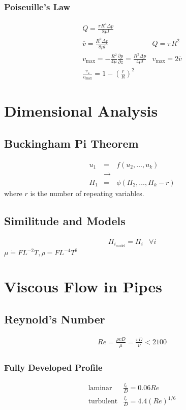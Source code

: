 \documentclass[a4paper]{amsart}
\begin{document}
\subsubsection{Poiseuille's Law}
\begin{eqnarray*}
	Q=\frac{\pi R^4\Delta p}{8\mu l}\\
	\overline v = \frac{R^2\Delta p}{8\mu l}&Q=\pi R^2\\
	v_{\text{max}}=-\frac{R^2}{4\mu}\frac{\partial p}{\partial z}=\frac{R^2\Delta p}{4\mu l}
	& v_{\text{max}}=2\overline v\\
	\frac{v_z}{v_{\text{max}}}=1-\left(\frac{r}{R}\right)^2
\end{eqnarray*}


\section{Dimensional Analysis}
\subsection{Buckingham Pi Theorem}
\begin{eqnarray*}
	u_1&=&f(u_2,\dots,u_k)\\
	&\rightarrow&
	\\
	\Pi_1&=&\phi(\Pi_2,\dots,\Pi_k-r)
\end{eqnarray*}
where $r$ is the number of repeating variables.
\subsection{Similitude and Models}
\begin{eqnarray*}
	\Pi_{i_{\text{model}}}=\Pi_i&\forall i
\end{eqnarray*}
$\mu\dot =FL^{-2}T, \rho=FL^{-4}T^2$


\section{Viscous Flow in Pipes}
\subsection{Reynold's Number}
\begin{eqnarray*}
	Re=\frac{\rho vD}{\mu}=\frac{vD}{\nu}<2100
\end{eqnarray*}
\subsubsection{Fully Developed Profile}
\begin{eqnarray*}
	\text{laminar} &\frac{l_e}{D}=0.06 Re
	\\
	\text{turbulent} &\frac{l_e}{D}=4.4(Re)^{1/6}
\end{eqnarray*}
\end{document}

